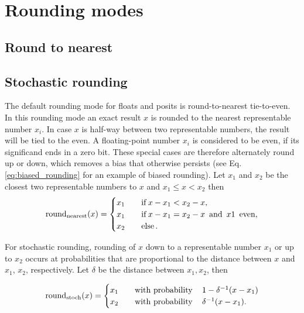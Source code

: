 \section{Rounding modes}
\label{sec:rounding}

\subsection{Round to nearest}
\label{sec:roundnearest}

\subsection{Stochastic rounding}
\label{sec:stochastic_rounding} 

The default rounding mode for floats and posits is round-to-nearest tie-to-even. In this rounding mode an exact result $x$ is rounded
to the nearest representable number $x_i$. In case $x$ is half-way between two representable numbers, the result will be tied to the
even. A floating-point number $x_i$ is considered to be even, if its significand ends in a zero bit. These special cases are therefore
alternately round up or down, which removes a bias that otherwise persists (see Eq. \ref{eq:biased_rounding} for an example of biased rounding).
Let $x_1$ and $x_2$ be the closest two representable numbers to $x$ and $x_1 \leq x < x_2$ then
\begin{equation}
\operatorname{round}_{\operatorname{nearest}}(x) =
\begin{cases}
x_1 \quad &\operatorname{if} x - x_1 < x_2 - x,  \\
x_1 &\operatorname{if} x-x_1 = x_2 - x \operatorname{~and~} x1 \operatorname{~even}, \\
x_2 &\operatorname{else}.
\end{cases}
\label{eq:roundnearest}
\end{equation}

For stochastic rounding, rounding of $x$ down to a representable number $x_1$ or up to $x_2$ occurs at probabilities that are proportional
to the distance between $x$ and $x_1$, $x_2$, respectively. Let $\delta$ be the distance between $x_1,x_2$, then

\begin{equation}
\operatorname{round}_{\operatorname{stoch}}(x) =
\begin{cases}
x_1 \quad &\operatorname{with~probability}\quad 1 - \delta^{-1}(x - x_1)  \\
x_2 &\operatorname{with~probability}\quad  \delta^{-1}(x - x_1).
\end{cases}
\label{eq:stochround}
\end{equation}

